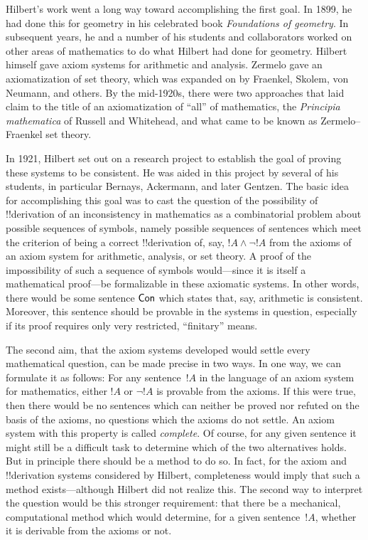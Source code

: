 \documentclass[../../../include/open-logic-section]{subfiles}
\begin{document}
Hilbert's work went a long way toward accomplishing the first goal.
In 1899, he had done this for geometry in his celebrated book
\emph{Foundations of geometry}. In subsequent years, he and a number
of his students and collaborators worked on other areas of mathematics
to do what Hilbert had done for geometry.  Hilbert himself gave axiom
systems for arithmetic and analysis. Zermelo gave an axiomatization of
set theory, which was expanded on by Fraenkel, Skolem, von Neumann,
and others.  By the mid-1920s, there were two approaches that laid
claim to the title of an axiomatization of ``all'' of mathematics, the
\emph{Principia mathematica} of Russell and Whitehead, and what came to
be known as Zermelo--Fraenkel set theory.

In 1921, Hilbert set out on a research project to establish the goal
of proving these systems to be consistent.  He was aided in this
project by several of his students, in particular Bernays, Ackermann,
and later Gentzen. The basic idea for accomplishing this goal was to
cast the question of the possibility of !!{derivation} of an
inconsistency in mathematics as a combinatorial problem about possible
sequences of symbols, namely possible sequences of sentences which
meet the criterion of being a correct !!{derivation} of, say, $!A \land
\lnot !A$ from the axioms of an axiom system for arithmetic, analysis,
or set theory.  A proof of the impossibility of such a sequence of
symbols would---since it is itself a mathematical proof---be
formalizable in these axiomatic systems.  In other words, there would
be some sentence $\OCon$ which states that, say, arithmetic is
consistent.  Moreover, this sentence should be provable in the systems
in question, especially if its proof requires only very restricted,
``finitary'' means.

The second aim, that the axiom systems developed would settle every
mathematical question, can be made precise in two ways. In one way, we
can formulate it as follows: For any sentence~$!A$ in the language of
an axiom system for mathematics, either $!A$ or $\lnot !A$ is provable
from the axioms.  If this were true, then there would be no sentences
which can neither be proved nor refuted on the basis of the axioms, no
questions which the axioms do not settle.  An axiom system with this
property is called \emph{complete}. Of course, for any given sentence
it might still be a difficult task to determine which of the two
alternatives holds.  But in principle there should be a method to do
so.  In fact, for the axiom and !!{derivation} systems considered by
Hilbert, completeness would imply that such a method exists---although
Hilbert did not realize this.  The second way to interpret the
question would be this stronger requirement: that there be a
mechanical, computational method which would determine, for a given
sentence~$!A$, whether it is derivable from the axioms or not.
\end{document}
